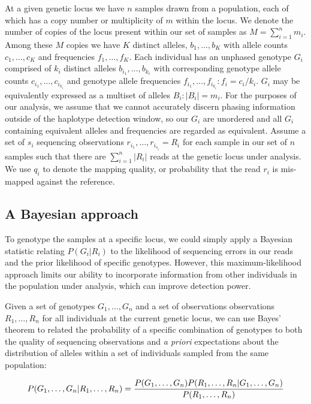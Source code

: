 \documentclass{article}
\begin{document}
At a given genetic locus we have $n$ samples drawn from a population, each of which has a copy number or multiplicity of $m$ within the locus.  We denote the number of copies of the locus present within our set of samples as $M = \sum_{i=1}^n m_i$.  Among these $M$ copies we have $K$ distinct alleles, $b_1,\ldots,b_K$ with allele counts $c_1,\ldots,c_K$ and frequencies $f_1,\ldots,f_K$.  Each individual has an unphased genotype $G_i$ comprised of $k_i$ distinct alleles $b_{i_1},\ldots,b_{k_i}$ with corresponding genotype allele counts $c_{i_1},\ldots,c_{i_{k_i}}$ and genotype allele frequencies $f_{i_1},\ldots,f_{i_{k_i}} : f_i = c_i / k_i$.  $G_i$ may be equivalently expressed as a multiset of alleles $B_i : | B_i | = m_i$.  For the purposes of our analysis, we assume that we cannot accurately discern phasing information outside of the haplotype detection window, so our $G_i$ are unordered and all $G_i$ containing equivalent alleles and frequencies are regarded as equivalent.  Assume a set of $s_i$ sequencing observations $r_{i_1},\ldots,r_{i_{s_i}} = R_i$ for each sample in our set of $n$ samples such that there are $ \sum_{i=1}^n |R_i|$ reads at the genetic locus under analysis.  We use $q_i$ to denote the mapping quality, or probability that the read $r_i$ is mis-mapped against the reference.

\subsection{A Bayesian approach}
\label{sec:modeloverview}

To genotype the samples at a specific locus, we could simply apply a Bayesian statistic relating $P(G_i|R_i)$ to the likelihood of sequencing errors in our reads and the prior likelihood of specific genotypes.  However, this maximum-likelihood approach limits our ability to incorporate information from other individuals in the population under analysis, which can improve detection power.

Given a set of genotypes $G_1,\ldots,G_n$ and a set of observations observations $R_1,\ldots,R_n$ for all individuals at the current genetic locus, we can use Bayes' theorem to related the probability of a specific combination of genotypes to both the quality of sequencing observations and \emph{a priori} expectations about the distribution of alleles within a set of individuals sampled from the same population:


\begin{equation}
P(G_1,\ldots,G_n|R_1,\ldots,R_n) 
= { P(G_1,\ldots,G_n) P(R_1,\ldots,R_n|G_1,\ldots,G_n) \over P(R_1,\ldots,R_n)} \\
\end{equation}
\end{document}
